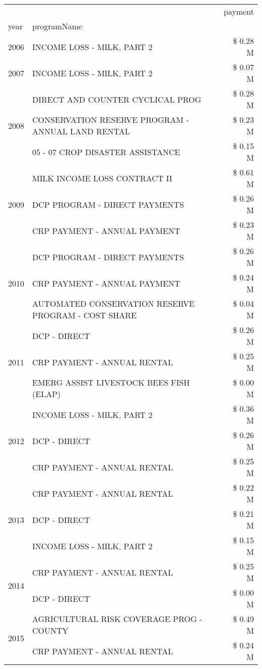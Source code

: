 \begin{tabular}{llr}
\toprule
 &  & payment \\
year & programName &  \\
\midrule
2006 & INCOME LOSS - MILK, PART 2 & \$ 0.28 M \\
\cline{1-3}
2007 & INCOME LOSS - MILK, PART 2 & \$ 0.07 M \\
\cline{1-3}
\multirow[t]{3}{*}{2008} & DIRECT AND COUNTER CYCLICAL PROG & \$ 0.28 M \\
 & CONSERVATION RESERVE PROGRAM - ANNUAL LAND RENTAL & \$ 0.23 M \\
 & 05 - 07 CROP DISASTER ASSISTANCE & \$ 0.15 M \\
\cline{1-3}
\multirow[t]{3}{*}{2009} & MILK INCOME LOSS CONTRACT II & \$ 0.61 M \\
 & DCP PROGRAM - DIRECT PAYMENTS & \$ 0.26 M \\
 & CRP PAYMENT - ANNUAL PAYMENT & \$ 0.23 M \\
\cline{1-3}
\multirow[t]{3}{*}{2010} & DCP PROGRAM - DIRECT PAYMENTS & \$ 0.26 M \\
 & CRP PAYMENT - ANNUAL PAYMENT & \$ 0.24 M \\
 & AUTOMATED CONSERVATION RESERVE PROGRAM - COST SHARE & \$ 0.04 M \\
\cline{1-3}
\multirow[t]{3}{*}{2011} & DCP - DIRECT & \$ 0.26 M \\
 & CRP PAYMENT - ANNUAL RENTAL & \$ 0.25 M \\
 & EMERG ASSIST LIVESTOCK BEES FISH (ELAP) & \$ 0.00 M \\
\cline{1-3}
\multirow[t]{3}{*}{2012} & INCOME LOSS - MILK, PART 2 & \$ 0.36 M \\
 & DCP - DIRECT & \$ 0.26 M \\
 & CRP PAYMENT - ANNUAL RENTAL & \$ 0.25 M \\
\cline{1-3}
\multirow[t]{3}{*}{2013} & CRP PAYMENT - ANNUAL RENTAL & \$ 0.22 M \\
 & DCP - DIRECT & \$ 0.21 M \\
 & INCOME LOSS - MILK, PART 2 & \$ 0.15 M \\
\cline{1-3}
\multirow[t]{2}{*}{2014} & CRP PAYMENT - ANNUAL RENTAL & \$ 0.25 M \\
 & DCP - DIRECT & \$ 0.00 M \\
\cline{1-3}
\multirow[t]{2}{*}{2015} & AGRICULTURAL RISK COVERAGE PROG - COUNTY & \$ 0.49 M \\
 & CRP PAYMENT - ANNUAL RENTAL & \$ 0.24 M \\
\cline{1-3}

\end{tabular}
